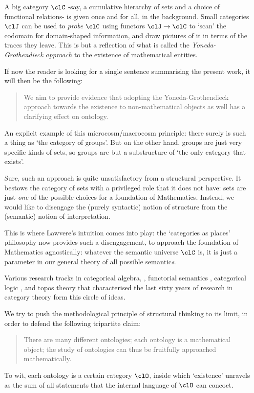 A big category $\clC$ -say, a cumulative hierarchy of sets and a choice of functional relations- is given once and for all, in the background. Small categories $\clJ$ can be used to \emph{probe} $\clC$ using functors $\clJ \to \clC$ to `scan' the codomain for domain-shaped information, and draw pictures of it in terms of the traces they leave. This is but a reflection of what is called the \emph{Yoneda-Grothendieck approach} to the existence of mathematical entities.

If now the reader is looking for a single sentence summarising the present work, it will then be the following:
\begin{quote}
	We aim to provide evidence that adopting the Yoneda-Grothendieck approach towards the existence to non-mathematical objects as well has a clarifying effect on ontology.
\end{quote}
An explicit example of this microcosm\fshyp{}macrocosm principle: there surely is such a thing as `the category of groups'. But on the other hand, groups are just very specific kinds of sets, so groups are but a substructure of `the only category that exists'.

Sure, such an approach is quite unsatisfactory from a structural perspective. It bestows the category of sets with a privileged role that it does not have: sets are just \emph{one} of the possible choices for a foundation of Mathematics. Instead, we would like to disengage the (purely syntactic) notion of structure from the (semantic) notion of interpretation.

This is where Lawvere's intuition comes into play: the `categories as places' philosophy now provides such a disengagement, to approach the foundation of Mathematics agnostically: whatever the semantic universe $\clC$ is, it is just a parameter in our general theory of all possible semantic\emph{s}.

Various research tracks in categorical algebra, \cite{Janelidze2004}, functorial semantics \cite{lawvere1963functorial,hyland2007category}, categorical logic \cite{lambek1988introduction}, and topos theory \cite{JohnstonePT} that characterised the last sixty years of research in category theory form this circle of ideas.

We try to push the methodological principle of structural thinking to its limit, in order to defend the following tripartite claim: 
\begin{quote}
  There are many different ontologies; each ontology is a mathematical object; the study of ontologies can thus be fruitfully approached mathematically.
\end{quote}
To wit, each ontology is a certain category $\clO$, inside which `existence' unravels as the sum of all statements that the internal language of $\clO$ can concoct.

